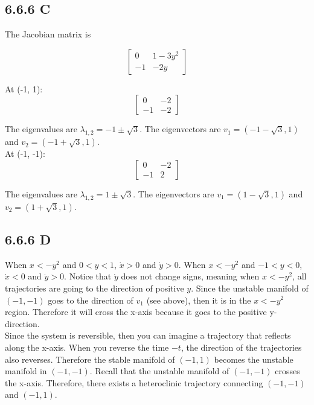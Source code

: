 \documentclass[]{article}
\begin{document}
	\subsection*{6.6.6 C} The Jacobian matrix is
	
	\begin{equation*}
	\begin{bmatrix}
	0 & 1-3y^2 \\
	-1 & -2y
	\end{bmatrix}
	\end{equation*}
	
	At (-1, 1):
	\begin{equation*}
	\begin{bmatrix}
	0 & -2\\
	-1 & -2
	\end{bmatrix}
	\end{equation*}
	
	The eigenvalues are $\lambda_{1,2} = -1 \pm \sqrt{3}$. The eigenvectors are $v_1 = (-1-\sqrt{3}, 1)$ and $v_2 = (-1+\sqrt{3}, 1)$.\\
	
	At (-1, -1):
	\begin{equation*}
	\begin{bmatrix}
	0 & -2\\
	-1 & 2
	\end{bmatrix}
	\end{equation*}
	
	The eigenvalues are $\lambda_{1,2} = 1 \pm \sqrt{3}$. The eigenvectors are $v_1 = (1-\sqrt{3}, 1)$ and $v_2 = (1+\sqrt{3}, 1)$.\\
	
	\subsection*{6.6.6 D}
	When $x < -y^2$ and $0 < y < 1$, $\dot x > 0$ and $\dot y > 0$. When $x < -y^2$ and $-1 < y < 0$, $\dot x < 0$ and $\dot y > 0$. Notice that $\dot y$ does not change signs, meaning when $x < -y^2$, all trajectories are going to the direction of positive $y$. Since the unstable manifold of $(-1, -1)$ goes to the direction of $v_1$ (see above), then it is in the $x < -y^2$ region. Therefore it will cross the x-axis because it goes to the positive y-direction. \\
	
	Since the system is reversible, then you can imagine a trajectory that reflects along the x-axis. When you reverse the time $-t$, the direction of the trajectories also reverses. Therefore the stable manifold of $(-1, 1)$ becomes the unstable manifold in $(-1, -1)$. Recall that the unstable manifold of $(-1, -1)$ crosses the x-axis. Therefore, there exists a heteroclinic trajectory connecting $(-1, -1)$ and $(-1, 1)$.\\
	
\end{document}
